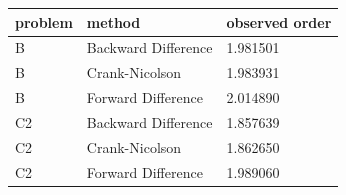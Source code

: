 \begin{tabular}{lll}
\toprule
problem & method & observed order \\
\midrule
B & Backward Difference & 1.981501 \\
B & Crank-Nicolson & 1.983931 \\
B & Forward Difference & 2.014890 \\
C2 & Backward Difference & 1.857639 \\
C2 & Crank-Nicolson & 1.862650 \\
C2 & Forward Difference & 1.989060 \\
\bottomrule
\end{tabular}
